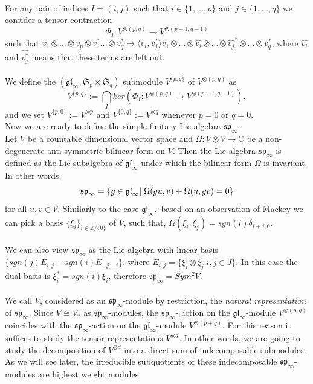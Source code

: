 \\For any pair of indices $I=(i,j)$ such that $i\in\{1, \dots ,p\}$ and $j\in \{1,\dots,q\}$ we consider a tensor contraction
$$\Phi_{I}:V^{\otimes (p,q)}\rightarrow V^{\otimes(p-1,q-1)}$$ such that $v_1\otimes\dots \otimes v_p\otimes v_1^*\dots\otimes v_q^*\mapsto \langle v_i,v_j^*\rangle v_1 \otimes \dots \otimes \hat{v_i}\otimes \dots \otimes \hat{v_j}^* \otimes \dots \otimes v_q^* $, where $\hat{v_i}$ and $\hat{v_j^{*}}$ means that these terms are left out.\\ 
\\We define the $(\mathfrak{gl}_{\infty},\mathfrak{S}_p\times \mathfrak{S}_q)$ submodule $V^{\{p,q\}}$ of $V^{\otimes(p,q)}$ as
$$V^{\{p,q\}}:= \bigcap_{I}  ker(\Phi_I : V^{\otimes (p,q)} \rightarrow V^{\otimes(p-1,q-1)} ),$$ and we set $V^{\{p,0\}}:=V^{\otimes p}$ and 
$V^{\{0,q\}}:=V^{\otimes q}$ whenever $p=0$ or $q=0$.
\\Now we are ready to define the simple finitary Lie algebra $\mathfrak{sp}_{\infty}$.
\\Let $V$ be a countable dimensional vector space and $\Omega : V\otimes V\rightarrow \mathbb{C}$ be a non-degenerate anti-symmetric bilinear form on $V$. Then the Lie algebra $\mathfrak{sp}_{\infty }$ is defined as the Lie subalgebra of $\mathfrak{gl}_{\infty}$ under which the bilinear form $\Omega$ is invariant. In other words,
$$\mathfrak{sp}_{\infty}=\{g\in \mathfrak{gl}_{\infty} |\hspace{1mm}\Omega(gu,v)+\Omega(u,gv)=0\}$$ for all $u,v \in V$.
Similarly to the case $\mathfrak{gl}_{\infty},$ based on an observation of Mackey we can pick a basis $\{\xi_i\}_{i \in \mathbb{Z}/\{ 0 \}}$ of $V$, such that, $\Omega(\xi_i,\xi_j)=sgn(i)\delta_{i+j,0}$.\\ \\ We can also view $\mathfrak{sp}_{\infty }$ as the Lie algebra with linear basis 
$\{sgn(j) E_{i,j}-sgn(i)E_{-j,-i}\}$, where $E_{i,j}=\{\xi_i\otimes \xi_j| i,j \in J\}$. In this case the dual basis is $\xi_i^*=sgn(i)\xi_i$, therefore $\mathfrak{sp}_{\infty}=Sym^2V$.
\\ \\We call $V$, considered as an $\mathfrak{sp}_{\infty}$-module by restriction, the \emph{natural representation} of $\mathfrak{sp}_{\infty}$. Since $V\cong V_{*}$ as $\mathfrak{sp}_{\infty}$-modules, the $\mathfrak{sp}_{\infty}$- action on the $\mathfrak{gl}_{\infty}$-module $V^{\otimes(p,q)}$ coincides with the $\mathfrak{sp}_{\infty}$-action on the $\mathfrak{gl}_{\infty}$-module $V^{\otimes(p+q)}$. For this reason it suffices to study the  tensor representations $V^{\otimes d}$. In other words, we are going to study the decomposition of $V^{\otimes d}$ into a direct sum of indecomposable submodules. As we will see later, the irreducible subquotients of these indecomposable $\mathfrak{sp}_{\infty}$-modules are highest weight modules.\\
